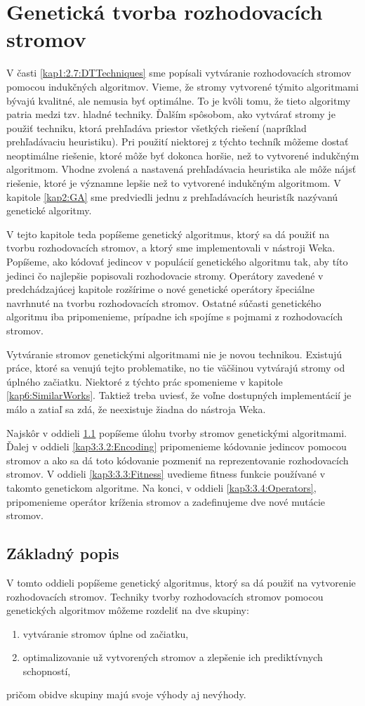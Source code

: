 \chapter{Genetická tvorba rozhodovacích stromov}\label{kap3:DTGA}
V časti \ref{kap1:2.7:DTTechniques} sme popísali vytváranie rozhodovacích stromov pomocou indukčných algoritmov. Vieme, že stromy vytvorené týmito algoritmami bývajú kvalitné, ale nemusia byť optimálne. To je kvôli tomu, že tieto algoritmy patria medzi tzv. hladné techniky. Ďalším spôsobom, ako vytvárať stromy je použiť techniku, ktorá prehľadáva priestor všetkých riešení (napríklad prehľadávaciu heuristiku). Pri použití niektorej z týchto techník môžeme dostať neoptimálne riešenie, ktoré môže byť dokonca horšie, než to vytvorené indukčným algoritmom. Vhodne zvolená a nastavená prehľadávacia heuristika ale môže nájsť riešenie, ktoré je významne lepšie než to vytvorené indukčným algoritmom. V kapitole \ref{kap2:GA} sme predviedli jednu z prehľadávacích heuristík nazývanú genetické algoritmy.

V tejto kapitole teda popíšeme genetický algoritmus, ktorý sa dá použiť na tvorbu rozhodovacích stromov, a ktorý sme implementovali v nástroji Weka. Popíšeme, ako kódovať jedincov v populácií genetického algoritmu tak, aby títo jedinci čo najlepšie popisovali rozhodovacie stromy. Operátory zavedené v predchádzajúcej kapitole rozšírime o nové genetické operátory špeciálne navrhnuté na tvorbu rozhodovacích stromov. Ostatné súčasti genetického algoritmu iba pripomenieme, prípadne ich spojíme s pojmami z rozhodovacích stromov.

Vytváranie stromov genetickými algoritmami nie je novou technikou. Existujú práce, ktoré sa venujú tejto problematike, no tie väčšinou vytvárajú stromy od úplného začiatku. Niektoré z týchto prác spomenieme v kapitole \ref{kap6:SimilarWorks}. Taktiež treba uviesť, že voľne dostupných implementácií je málo a zatiaľ sa zdá, že neexistuje žiadna do nástroja Weka.

Najskôr v oddieli \ref{kap3:3.1:Intro} popíšeme úlohu tvorby stromov genetickými algoritmami. Ďalej v oddieli \ref{kap3:3.2:Encoding} pripomenieme kódovanie jedincov pomocou stromov a ako sa dá toto kódovanie pozmeniť na reprezentovanie rozhodovacích stromov. V oddieli \ref{kap3:3.3:Fitness} uvedieme fitness funkcie používané v takomto genetickom algoritme. Na konci, v oddieli \ref{kap3:3.4:Operators}, pripomenieme operátor kríženia stromov a zadefinujeme dve nové mutácie stromov.
\section{Základný popis}\label{kap3:3.1:Intro}
V tomto oddieli popíšeme genetický algoritmus, ktorý sa dá použiť na vytvorenie rozhodovacích stromov. Techniky tvorby rozhodovacích stromov pomocou genetických algoritmov môžeme rozdeliť na dve skupiny:
\begin{enumerate}
\item vytváranie stromov úplne od začiatku,
\item optimalizovanie už vytvorených stromov a zlepšenie ich prediktívnych schopností,
\end{enumerate}
pričom obidve skupiny majú svoje výhody aj nevýhody.

